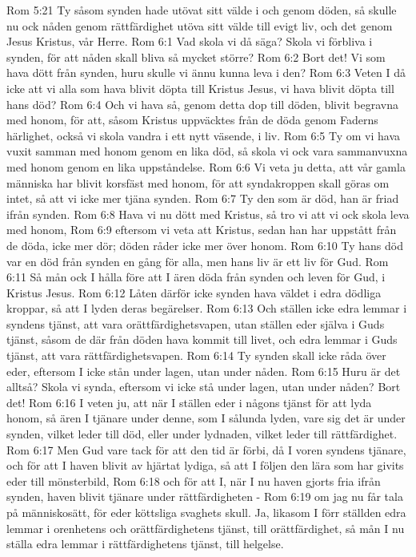 Rom 5:21  Ty såsom synden hade utövat sitt välde i och genom döden, så skulle nu ock nåden genom rättfärdighet utöva sitt välde till evigt liv, och det genom Jesus Kristus, vår Herre.
Rom 6:1  Vad skola vi då säga? Skola vi förbliva i synden, för att nåden skall bliva så mycket större?
Rom 6:2  Bort det! Vi som hava dött från synden, huru skulle vi ännu kunna leva i den?
Rom 6:3  Veten I då icke att vi alla som hava blivit döpta till Kristus Jesus, vi hava blivit döpta till hans död?
Rom 6:4  Och vi hava så, genom detta dop till döden, blivit begravna med honom, för att, såsom Kristus uppväcktes från de döda genom Faderns härlighet, också vi skola vandra i ett nytt väsende, i liv.
Rom 6:5  Ty om vi hava vuxit samman med honom genom en lika död, så skola vi ock vara sammanvuxna med honom genom en lika uppståndelse.
Rom 6:6  Vi veta ju detta, att vår gamla människa har blivit korsfäst med honom, för att syndakroppen skall göras om intet, så att vi icke mer tjäna synden.
Rom 6:7  Ty den som är död, han är friad ifrån synden.
Rom 6:8  Hava vi nu dött med Kristus, så tro vi att vi ock skola leva med honom,
Rom 6:9  eftersom vi veta att Kristus, sedan han har uppstått från de döda, icke mer dör; döden råder icke mer över honom.
Rom 6:10  Ty hans död var en död från synden en gång för alla, men hans liv är ett liv för Gud.
Rom 6:11  Så mån ock I hålla före att I ären döda från synden och leven för Gud, i Kristus Jesus.
Rom 6:12  Låten därför icke synden hava väldet i edra dödliga kroppar, så att I lyden deras begärelser.
Rom 6:13  Och ställen icke edra lemmar i syndens tjänst, att vara orättfärdighetsvapen, utan ställen eder själva i Guds tjänst, såsom de där från döden hava kommit till livet, och edra lemmar i Guds tjänst, att vara rättfärdighetsvapen.
Rom 6:14  Ty synden skall icke råda över eder, eftersom I icke stån under lagen, utan under nåden.
Rom 6:15  Huru är det alltså? Skola vi synda, eftersom vi icke stå under lagen, utan under nåden? Bort det!
Rom 6:16  I veten ju, att när I ställen eder i någons tjänst för att lyda honom, så ären I tjänare under denne, som I sålunda lyden, vare sig det är under synden, vilket leder till död, eller under lydnaden, vilket leder till rättfärdighet.
Rom 6:17  Men Gud vare tack för att den tid är förbi, då I voren syndens tjänare, och för att I haven blivit av hjärtat lydiga, så att I följen den lära som har givits eder till mönsterbild,
Rom 6:18  och för att I, när I nu haven gjorts fria ifrån synden, haven blivit tjänare under rättfärdigheten -
Rom 6:19  om jag nu får tala på människosätt, för eder köttsliga svaghets skull. Ja, likasom I förr ställden edra lemmar i orenhetens och orättfärdighetens tjänst, till orättfärdighet, så mån I nu ställa edra lemmar i rättfärdighetens tjänst, till helgelse.
